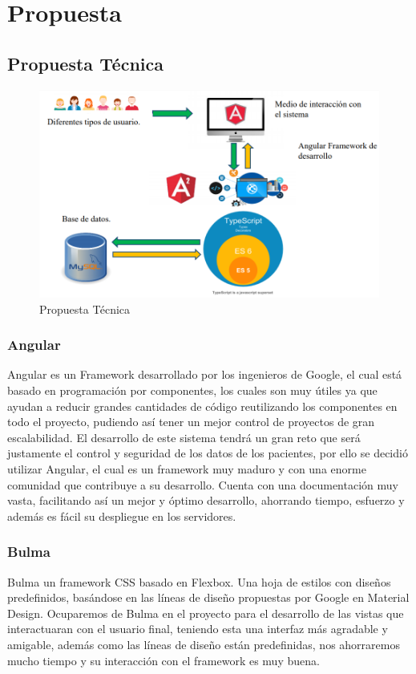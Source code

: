 \chapter{Propuesta} \label{sec:propuesta}

\section{Propuesta Técnica}

\begin{figure}[h]
  \label{propuesta}
  \centering
  \includegraphics[scale=.5]{lib/assets/propuesta-tecnica}
  \caption{Propuesta Técnica}
\end{figure}

\subsection{Angular }
Angular es un Framework desarrollado por los ingenieros de Google, el cual está basado en programación por componentes, los cuales son muy útiles ya que ayudan a reducir grandes cantidades de código reutilizando los componentes en todo el proyecto, pudiendo así tener un mejor control de proyectos de gran escalabilidad. El desarrollo de este sistema tendrá un gran reto que será justamente el control y seguridad de los datos de los pacientes, por ello se decidió utilizar Angular, el cual es un framework muy maduro y con una enorme comunidad que contribuye a su desarrollo. Cuenta con una documentación muy vasta, facilitando así un mejor y óptimo desarrollo, ahorrando tiempo, esfuerzo y además es fácil su despliegue en los servidores. \cite{Angular}

\subsection{Bulma}
Bulma un framework CSS basado en Flexbox. Una hoja de estilos con diseños predefinidos, basándose en las líneas de diseño propuestas por Google en Material Design.
Ocuparemos de Bulma en el proyecto para el desarrollo de las vistas que interactuaran con el usuario final, teniendo esta una interfaz más agradable y amigable, además como las líneas de diseño están predefinidas, nos ahorraremos mucho tiempo y su interacción con el framework es muy buena. \cite{Bulma}

